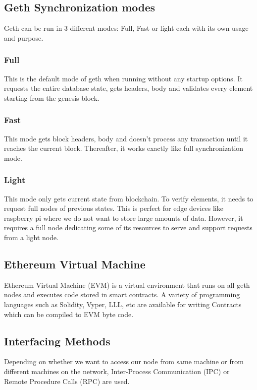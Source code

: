 \documentclass[11pt,openright]{report}
\begin{document}
\subsection{Geth Synchronization modes}
Geth can be run in 3 different modes: Full, Fast or light each with its own usage and purpose.

\subsubsection{Full} 
This is the default mode of geth when running without any startup options. It requests the entire database state, gets headers, body and validates every element starting from the genesis block.

\subsubsection{Fast}
This mode gets block headers, body and doesn't process any transaction until it reaches the current block. Thereafter, it works exactly like full synchronization mode.

\subsubsection{Light}
This mode only gets current state from blockchain. To verify elements, it needs to request full nodes of previous states. This is perfect for edge devices like raspberry pi where we do not want to store large amounts of data. However, it requires a full node dedicating some of its resources to serve and support requests from a light node.

\subsection{Ethereum Virtual Machine}
Ethereum Virtual Machine (EVM) is a virtual environment that runs on all geth nodes and executes code stored in smart contracts. A variety of programming languages such as Solidity, Vyper, LLL, etc are available for writing Contracts which can be compiled to EVM byte code.

\subsection{Interfacing Methods}
Depending on whether we want to access our node from same machine or from different machines on the network, Inter-Process Communication (IPC) or Remote Procedure Calls (RPC) are used.
\end{document}
